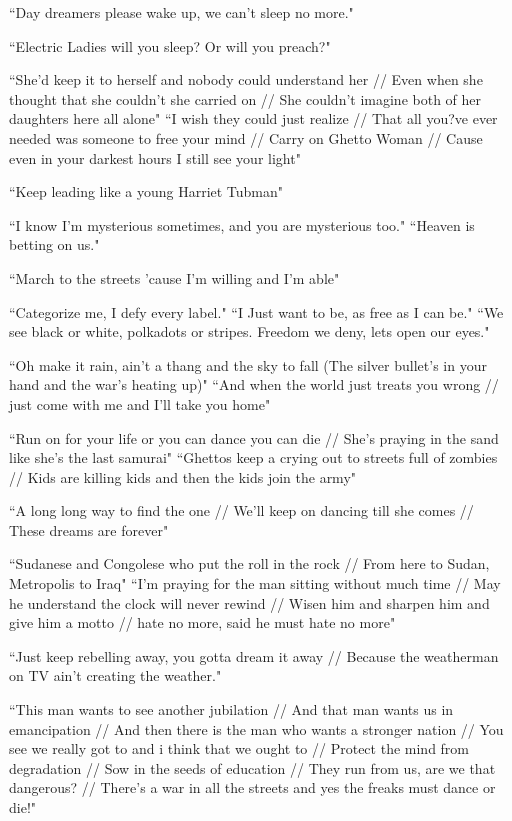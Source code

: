 \documentclass[11pt]{amsart}
\begin{document}
``Day dreamers please wake up, we can't sleep no more."\cite{sincerelyjane}

``Electric Ladies will you sleep? Or will you preach?"\cite{queen}

``She'd keep it to herself and nobody could understand her // Even when she thought that she couldn't she carried on // She couldn't imagine both of her daughters here all alone"\cite{ghettowoman}
``I wish they could just realize // That all you?ve ever needed was someone to free your mind // Carry on Ghetto Woman // Cause even in your darkest hours I still see your light" \cite{ghettowoman}

``Keep leading like a young Harriet Tubman"\cite{queen}

``I know I'm mysterious sometimes, and you are mysterious too."\cite{primetime}
``Heaven is betting on us."\cite{primetime}

``March to the streets 'cause I'm willing and I'm able"\cite{queen}

``Categorize me, I defy every label."\cite{queen}
``I Just want to be, as free as I can be."\cite{polkadottedstripes}
``We see black or white, polkadots or stripes. Freedom we deny, lets open our eyes."\cite{polkadottedstripes}

``Oh make it rain, ain't a thang and the sky to fall (The silver bullet's in your hand and the war's heating up)" \cite{manymoons}
``And when the world just treats you wrong // just come with me and I'll take you home" \cite{manymoons}

``Run on for your life or you can dance you can die // She's praying in the sand like she's the last samurai"\cite{danceordie}
``Ghettos keep a crying out to streets full of zombies // Kids are killing kids and then the kids join the army"\cite{danceordie}

``A long long way to find the one // We'll keep on dancing till she comes // These dreams are forever"\cite{danceordie}

``Sudanese and Congolese who put the roll in the rock // From here to Sudan, Metropolis to Iraq"\cite{danceordie}
``I'm praying for the man sitting without much time // May he understand the clock will never rewind // Wisen him and sharpen him and give him a motto // hate no more, said he must hate no more"\cite{danceordie}

``Just keep rebelling away, you gotta dream it away // Because the weatherman on TV ain't creating the weather."\cite{danceordie}


``This man wants to see another jubilation //
And that man wants us in emancipation //
And then there is the man who wants a stronger nation //
You see we really got to and i think that we ought to //
Protect the mind from degradation //
Sow in the seeds of education //
They run from us, are we that dangerous? //
There's a war in all the streets and yes the freaks must dance or die!"\cite{danceordie}
\end{document}
